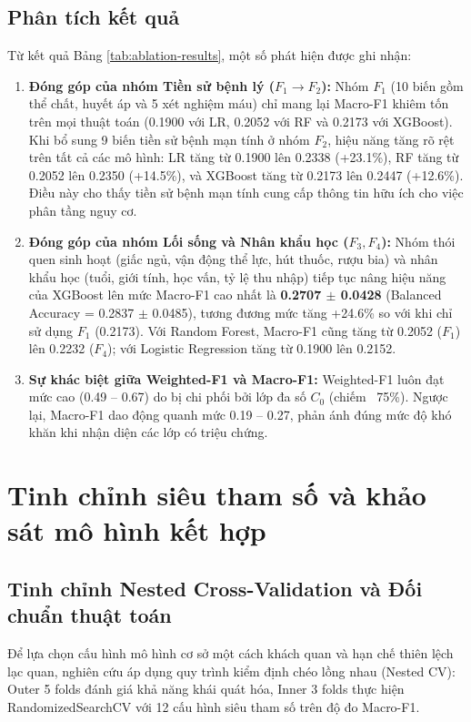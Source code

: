 \subsection{Phân tích kết quả}
Từ kết quả Bảng \ref{tab:ablation-results}, một số phát hiện được ghi nhận:
\begin{enumerate}
    \item \textbf{Đóng góp của nhóm Tiền sử bệnh lý ($F_1 \to F_2$):} Nhóm $F_1$ (10 biến gồm thể chất, huyết áp và 5 xét nghiệm máu) chỉ mang lại Macro-F1 khiêm tốn trên mọi thuật toán (0.1900 với LR, 0.2052 với RF và 0.2173 với XGBoost). Khi bổ sung 9 biến tiền sử bệnh mạn tính ở nhóm $F_2$, hiệu năng tăng rõ rệt trên tất cả các mô hình: LR tăng từ 0.1900 lên 0.2338 (+23.1\%), RF tăng từ 0.2052 lên 0.2350 (+14.5\%), và XGBoost tăng từ 0.2173 lên 0.2447 (+12.6\%). Điều này cho thấy tiền sử bệnh mạn tính cung cấp thông tin hữu ích cho việc phân tầng nguy cơ.
    \item \textbf{Đóng góp của nhóm Lối sống và Nhân khẩu học ($F_3, F_4$):} Nhóm thói quen sinh hoạt (giấc ngủ, vận động thể lực, hút thuốc, rượu bia) và nhân khẩu học (tuổi, giới tính, học vấn, tỷ lệ thu nhập) tiếp tục nâng hiệu năng của XGBoost lên mức Macro-F1 cao nhất là \textbf{0.2707 $\pm$ 0.0428} (Balanced Accuracy = 0.2837 $\pm$ 0.0485), tương đương mức tăng +24.6\% so với khi chỉ sử dụng $F_1$ (0.2173). Với Random Forest, Macro-F1 cũng tăng từ 0.2052 ($F_1$) lên 0.2232 ($F_4$); với Logistic Regression tăng từ 0.1900 lên 0.2152.
    \item \textbf{Sự khác biệt giữa Weighted-F1 và Macro-F1:} Weighted-F1 luôn đạt mức cao (0.49 -- 0.67) do bị chi phối bởi lớp đa số $C_0$ (chiếm ~75\%). Ngược lại, Macro-F1 dao động quanh mức 0.19 -- 0.27, phản ánh đúng mức độ khó khăn khi nhận diện các lớp có triệu chứng.
\end{enumerate}

\section{Tinh chỉnh siêu tham số và khảo sát mô hình kết hợp}
\label{sec:tuning-va-ensemble}

\subsection{Tinh chỉnh Nested Cross-Validation và Đối chuẩn thuật toán}
Để lựa chọn cấu hình mô hình cơ sở một cách khách quan và hạn chế thiên lệch lạc quan, nghiên cứu áp dụng quy trình kiểm định chéo lồng nhau (Nested CV): Outer 5 folds đánh giá khả năng khái quát hóa, Inner 3 folds thực hiện RandomizedSearchCV với 12 cấu hình siêu tham số trên độ đo Macro-F1.

